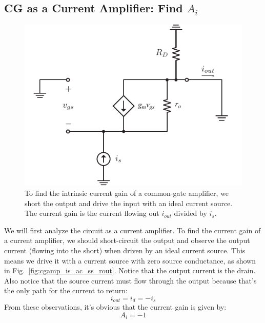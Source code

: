 \subsection{CG as a Current Amplifier: Find $A_{i}$}

\begin{figure}[tb]
\begin{center}
\includegraphics[scale=.9]{cgamp_is_ac_ss_short}
\end{center}
\caption{To find the intrinsic current gain of a common-gate amplifier, we short the output and drive the input with an ideal current source.  The current gain is the current flowing out $i_{out}$ divided by $i_s$.} \label{fig:cgamp_is_ac_ss_short}
\end{figure}


We will first analyze the circuit as a current amplifier.  To find the current gain of a current amplifier, we should short-circuit the output and observe the output current (flowing into the short) when driven by an ideal current source.  This means we drive it with a current source with zero source conductance, as shown in Fig.~\ref{fig:cgamp_is_ac_ss_rout}.  Notice that the output current is the drain.  Also notice that the source current must flow through the output because that's the only path for the current to return:
%
\begin{equation}
	{i_{out}} = {i_d} =  - {i_s}
\end{equation}
%
From these observations, it's obvious that the current gain is given by:
%
\begin{equation}
	{A_i} =  - 1
\end{equation}


